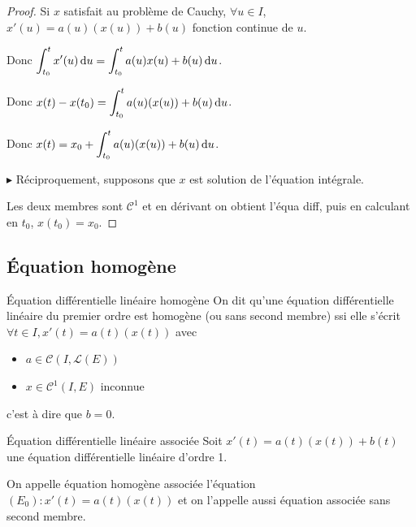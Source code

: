 \begin{proof}
    Si $x$ satisfait au problème de Cauchy, $\forall u \in I$, 
    $x'(u) = a(u)(x(u)) + b(u)$ fonction continue de $u$. 

    Donc $\displaystyle \int_{t_0}^{t } x'(u) \, \mathrm d u = \int_{t_0}^{t} a(u)x(u) + b(u) \, \mathrm d u$.

    Donc $\displaystyle x(t) - x(t_0) = \int_{t_0}^{t} a(u)(x(u)) + b(u) \, \mathrm d u$.

    Donc $\displaystyle x(t) = x_0 + \int_{t_0}^{t} a(u)(x(u)) + b(u) \, \mathrm d u$.

    \avspace $\blacktriangleright$ Réciproquement, supposons que $x$ est solution de l'équation intégrale.

    Les deux membres sont $\mathscr C^1$ et en dérivant on obtient l'équa diff, puis en 
    calculant en $t_0$, $x(t_0) = x_0$.
\end{proof}

\subsection{\'Equation homogène}

\begin{definition}{\'Equation différentielle linéaire homogène}{}
    On dit qu'une équation différentielle linéaire du premier ordre est homogène (ou sans second membre)
    ssi elle s'écrit $\forall t \in I, x'(t) = a(t)(x(t))$ avec 

    \begin{itemize}
        \item $a \in \mathscr C(I, \mathscr L(E))$
        \item $x \in \mathscr C^1(I, E)$ inconnue
    \end{itemize}

    c'est à dire que $b = 0$. 
\end{definition}


\begin{definition}{\'Equation différentielle linéaire associée}{}
    Soit $x'(t) = a(t)(x(t)) + b(t)$ une équation différentielle linéaire d'ordre 1. 

    On appelle équation homogène associée l'équation 
    $(E_0) : x'(t) = a(t)(x(t))$ et on l'appelle aussi équation associée sans second membre.
\end{definition}

